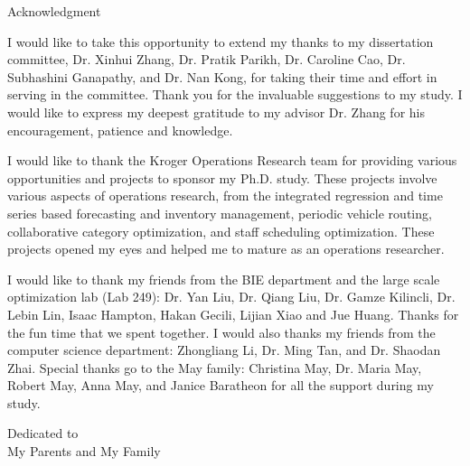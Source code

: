 \documentclass[12pt,english]{report}
\begin{document}
\begin{doublespace}
    \tableofcontents
    \listoffigures
    \listoftables
\end{doublespace}
%
\newpage
\thispagestyle{plain}
\setlength{\parindent}{0em}
\begin{center}
    {\huge Acknowledgment}
\end{center}

\setlength{\parindent}{2em}

I would like to take this opportunity to extend my thanks 
to my dissertation committee,  Dr. Xinhui Zhang, Dr. 
Pratik Parikh, Dr. Caroline Cao, Dr. Subhashini 
Ganapathy, and Dr. Nan Kong, for taking their time and effort 
in serving in the committee. Thank you for the invaluable 
suggestions to my study.  I would like to express my 
deepest gratitude to my advisor Dr. Zhang for his 
encouragement, patience and knowledge.

I would like to thank the Kroger Operations Research team 
for providing various opportunities and projects to 
sponsor my Ph.D. study.  These projects involve various 
aspects of operations research, from the integrated 
regression and time series based forecasting and 
inventory management, periodic vehicle routing, 
collaborative category optimization, and staff scheduling 
optimization.  These projects opened my eyes and helped 
me to mature as an operations researcher.

I would like to thank my friends from the BIE department 
and the large scale optimization lab (Lab 249): Dr. Yan 
Liu, Dr. Qiang Liu, Dr. Gamze Kilincli, Dr. Lebin Lin, Isaac Hampton, 
Hakan Gecili, Lijian Xiao and Jue Huang. Thanks for the 
fun time that we spent together. I would also thanks my 
friends from the computer science department: Zhongliang 
Li, Dr. Ming Tan, and Dr. Shaodan Zhai.
Special thanks go to the May family: Christina May, Dr. 
Maria May, Robert May, Anna May, and Janice Baratheon for 
all the support during my study.

%
\newpage
\thispagestyle{plain}
\vspace*{3in}
\begin{center}
    Dedicated to\\
    My Parents and My Family
\end{center}
\end{document}
